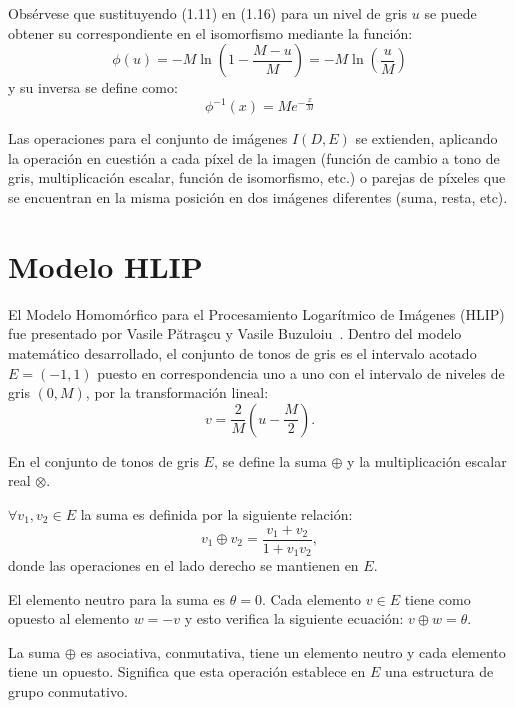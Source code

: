 Obs\'ervese que sustituyendo (1.11) en (1.16) para un nivel de gris $u$ se puede obtener su correspondiente en el isomorfismo mediante la funci\'on:
\begin{equation}
	\phi(u) = -M\ln\left(1-\frac{M-u}{M}\right) = -M\ln\left(\frac{u}{M}\right)
\end{equation}
y su inversa se define como:
\begin{equation}
	\phi^{-1}(x) = Me^{-\frac{x}{M}} 
\end{equation}

Las operaciones para el conjunto de im\'agenes $I(D,E)$ se extienden, aplicando la operaci\'on en cuesti\'on a cada p\'ixel de la imagen (funci\'on de cambio a tono de gris, multiplicaci\'on escalar, funci\'on de isomorfismo, etc.) o parejas de p\'ixeles que se encuentran en la misma posici\'on en dos im\'agenes diferentes (suma, resta, etc). 

\section{Modelo HLIP}

El Modelo Homom\'orfico para el Procesamiento Logar\'itmico de Im\'agenes (HLIP) fue presentado por Vasile Pătraşcu y Vasile Buzuloiu~\cite{patrascu2014mathematical}. Dentro del modelo matemático desarrollado, el conjunto de tonos de gris es el intervalo acotado $E = (-1, 1)$ puesto en correspondencia uno a uno con el intervalo de niveles de gris $(0,M)$, por la transformaci\'on lineal:
\begin{equation}
	v=\frac{2}{M}\left(u-\frac{M}{2}\right).
\end{equation}

En el conjunto de tonos de gris $E$, se define la suma $\oplus$ y la multiplicación escalar real $\otimes$.

$\forall v_1,v_2 \in E$ la suma es definida por la siguiente relaci\'on:
\begin{equation}
	v_1 \oplus v_2=\frac{v_1+v_2}{1+v_1v_2},
\end{equation}
donde las operaciones en el lado derecho se mantienen en $E$.

El elemento neutro para la suma es $\theta = 0$. Cada elemento $v \in E$ tiene como opuesto al elemento $w = - v$ y esto verifica la siguiente ecuación: $v \oplus w = \theta$.

La suma $\oplus$ es asociativa, conmutativa, tiene un elemento neutro y cada elemento tiene un opuesto. Significa que esta operación establece en $E$ una estructura de grupo conmutativo.

